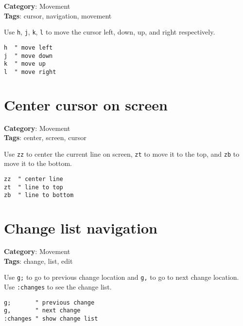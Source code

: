 {{{{{{{\textbf{Category}: Movement\\ \textbf{Tags}: cursor, navigation, movement
\vspace{0.5cm}

Use {\footnotesize \Verb§h§}, {\footnotesize \Verb§j§}, {\footnotesize \Verb§k§}, {\footnotesize \Verb§l§} to move the cursor left, down, up, and right respectively.

\begin{Exa*}{}
\begin{Verbatim}[fontsize=\footnotesize, breaklines, breakanywhere]
h  " move left
j  " move down
k  " move up
l  " move right
\end{Verbatim}
\end{Exa*}

\section{Center cursor on screen}

\textbf{Category}: Movement\\ \textbf{Tags}: center, screen, cursor
\vspace{0.5cm}

Use {\footnotesize \Verb§zz§} to center the current line on screen, {\footnotesize \Verb§zt§} to move it to the top, and {\footnotesize \Verb§zb§} to move it to the bottom.

\begin{Exa*}{}
\begin{Verbatim}[fontsize=\footnotesize, breaklines, breakanywhere]
zz  " center line
zt  " line to top
zb  " line to bottom
\end{Verbatim}
\end{Exa*}

\section{Change list navigation}

\textbf{Category}: Movement\\ \textbf{Tags}: change, list, edit
\vspace{0.5cm}

Use {\footnotesize \Verb§g;§} to go to previous change location and {\footnotesize \Verb§g,§} to go to next change location. Use {\footnotesize \Verb§:changes§} to see the change list.

\begin{Exa*}{}
\begin{Verbatim}[fontsize=\footnotesize, breaklines, breakanywhere]
g;       " previous change
g,       " next change
:changes " show change list
\end{Verbatim}
\end{Exa*}

}}}}}}}
